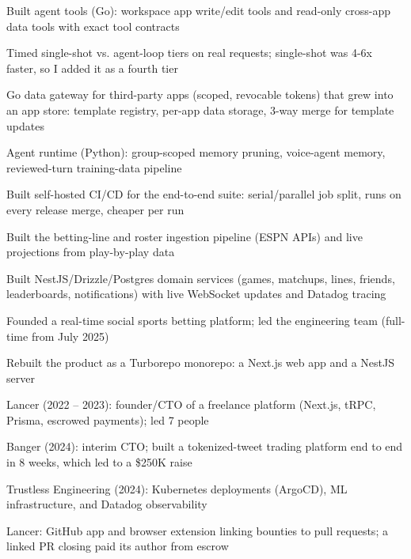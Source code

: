\documentclass[print]{jack-resume}
\begin{document}
\begin{tightemize}
    \item Built agent tools (Go): workspace app write/edit tools and read-only cross-app data tools with exact tool contracts
    \item Timed single-shot vs. agent-loop tiers on real requests; single-shot was 4-6x faster, so I added it as a fourth tier
    \item Go data gateway for third-party apps (scoped, revocable tokens) that grew into an app store: template registry, per-app data storage, 3-way merge for template updates
    \item Agent runtime (Python): group-scoped memory pruning, voice-agent memory, reviewed-turn training-data pipeline
    \item Built self-hosted CI/CD for the end-to-end suite: serial/parallel job split, runs on every release merge, cheaper per run
\end{tightemize}
\sectionsep

\begin{tightemize}
    \item Built the betting-line and roster ingestion pipeline (ESPN APIs) and live projections from play-by-play data
    \item Built NestJS/Drizzle/Postgres domain services (games, matchups, lines, friends, leaderboards, notifications) with live WebSocket updates and Datadog tracing
    \item Founded a real-time social sports betting platform; led the engineering team (full-time from July 2025)
    \item Rebuilt the product as a Turborepo monorepo: a Next.js web app and a NestJS server
\end{tightemize}
\sectionsep

\begin{tightemize}
    \item Lancer (2022 -- 2023): founder/CTO of a freelance platform (Next.js, tRPC, Prisma, escrowed payments); led 7 people
    \item Banger (2024): interim CTO; built a tokenized-tweet trading platform end to end in 8 weeks, which led to a \$250K raise
    \item Trustless Engineering (2024): Kubernetes deployments (ArgoCD), ML infrastructure, and Datadog observability
    \item Lancer: GitHub app and browser extension linking bounties to pull requests; a linked PR closing paid its author from escrow
\end{tightemize}
\sectionsep
\end{document}
